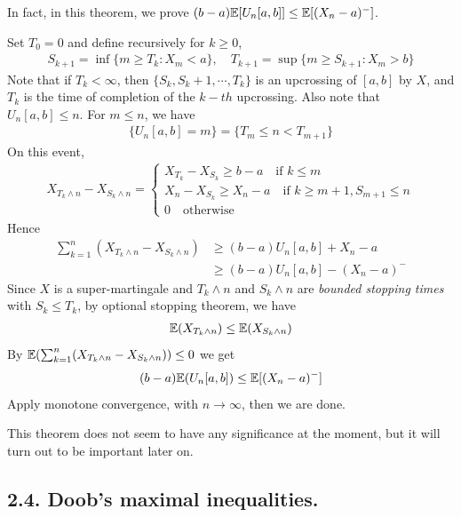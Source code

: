 \documentclass[10pt,a4paper]{report}
\newenvironment{proof}
{\begin{changemargin}{1cm}{0.5cm} 
	}%
	{\end{changemargin}
}
\begin{document}
In fact, in this theorem, we prove $(b-a) \mathbb{E}[U_n[a,b]] \leq  \mathbb{E}[(X_n-a)^{-}]$.
\begin{proof}
\pf Set $T_0 =0$ and define recursively for $k\geq 0$,
\begin{align*}
S_{k+1} = \inf \{m\geq T_k : X_m <a \}, \quad T_{k+1} = \sup \{m\geq S_{k+1} : X_m >b \}
\end{align*}
Note that if $T_k < \infty$, then $\{S_k, S_{k}+1,\cdots, T_k \}$ is an upcrossing of $[a,b]$ by $X$, and $T_k$ is the time of completion of the $k-th$ upcrossing. Also note that $U_n [a,b] \leq n$. For $m\leq n$, we have
\begin{align*}
\{U_n[a,b] =m \} = \{T_m \leq n < T_{m+1} \}
\end{align*}
On this event,
\begin{align*}
X_{T_k \wedge n}  - X_{S_k \wedge n} = \begin{cases}
X_{T_k} - X_{S_k} \geq b-a \quad \text{if } k\leq m \\
X_n - X_{S_k} \geq X_n -a \quad \text{if } k \geq m+1, S_{m+1} \leq n \\
0 \quad \text{otherwise}
\end{cases}
\end{align*}
Hence
\begin{align*}
\sum_{k=1}^n (X_{T_k \wedge n} - X_{S_k \wedge n}) &\geq (b-a) U_n[a,b] + X_n - a \\
&\geq (b-a)U_n[a,b] -(X_n -a)^-
\end{align*}
Since $X$ is a super-martingale and $T_k \wedge n$ and $S_k \wedge n$ are \emph{bounded stopping times} with $S_k \leq T_k$, by optional stopping theorem, we have
\begin{align*}
\mathbb{E} (X_{T_k \wedge n})\leq \mathbb{E}(X_{S_k \wedge n})
\end{align*}
By $\mathbb{E}(\sum_{k=1}^n (X_{T_k \wedge n} - X_{S_k \wedge n})) \leq 0$ we get
\begin{align*}
(b-a) \mathbb{E}(U_n[a,b]) \leq  \mathbb{E}[(X_n-a)^-]
\end{align*}
Apply monotone convergence, with $n\rightarrow \infty$, then we are done.

\eop
\end{proof}
\s

This theorem does not seem to have any significance at the moment, but it will turn out to be important later on.

\subsection*{2.4. Doob's maximal inequalities.}
\end{document}
